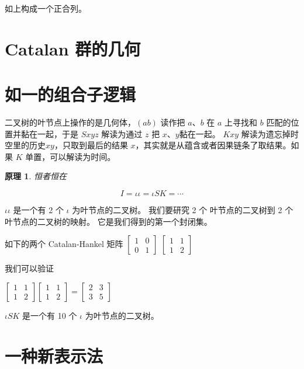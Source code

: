 \documentclass[a4paper,12pt]{article}
\numberwithin{definition}{section}
\numberwithin{lemma}{section}
\numberwithin{proposition}{section}
\numberwithin{theorem}{section}
\numberwithin{grammar}{section}
\numberwithin{program}{section}
\numberwithin{convention}{section}
\numberwithin{corollary}{section}
\newtheorem{principle}{原理}
\numberwithin{principle}{section}
\begin{document}
如上构成一个正合列。

\section{Catalan 群的几何}

\section{如一的组合子逻辑}

二叉树的叶节点上操作的是几何体，$(a b)$ 读作把 $a$、$b$ 在 $a$ 上寻找和 $b$ 匹配的位置并黏在一起，于是 $Sxyz$ 解读为通过 $z$ 把 $x$、$y$黏在一起。
$Kxy$ 解读为遗忘掉时空里的历史$xy$，只取到最后的结果 $x$，其实就是从蕴含或者因果链条了取结果。如果 $K$ 单置，可以解读为时间。

\begin{principle}
恒者恒在
\end{principle}

$$I = \iota \iota = \iota S K = \cdots $$

$\iota \iota$ 是一个有 2 个 $\iota$ 为叶节点的二叉树。
我们要研究 2 个 叶节点的二叉树到 2 个 叶节点的二叉树的映射。
它是我们得到的第一个封闭集。

如下的两个 Catalan-Hankel 矩阵
$\begin{bmatrix}1 & 0 \\ 0 & 1\end{bmatrix}$
$\begin{bmatrix}1 & 1 \\ 1 & 2\end{bmatrix}$

我们可以验证

$\begin{bmatrix}1 & 1 \\ 1 & 2\end{bmatrix}\begin{bmatrix}1 & 1 \\ 1 & 2\end{bmatrix} = \begin{bmatrix}2 & 3 \\ 3 & 5\end{bmatrix}$


$\iota S K$ 是一个有 10 个 $\iota$ 为叶节点的二叉树。


\newpage

\section{一种新表示法}
\end{document}
